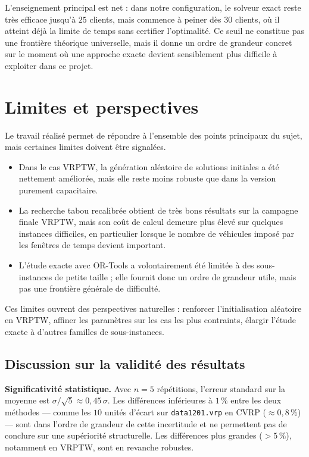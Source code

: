 \documentclass[11pt,a4paper]{article}
\begin{document}
L'enseignement principal est net : dans notre configuration, le solveur exact reste très efficace jusqu'à \(25\) clients, mais commence à peiner dès \(30\) clients, où il atteint déjà la limite de temps sans certifier l'optimalité. Ce seuil ne constitue pas une frontière théorique universelle, mais il donne un ordre de grandeur concret sur le moment où une approche exacte devient sensiblement plus difficile à exploiter dans ce projet.

\section{Limites et perspectives}
\label{sec:limites}

Le travail réalisé permet de répondre à l'ensemble des points principaux du sujet, mais certaines limites doivent être signalées.
\begin{itemize}
    \item Dans le cas VRPTW, la génération aléatoire de solutions initiales a été nettement améliorée, mais elle reste moins robuste que dans la version purement capacitaire.
    \item La recherche tabou recalibrée obtient de très bons résultats sur la campagne finale VRPTW, mais son coût de calcul demeure plus élevé sur quelques instances difficiles, en particulier lorsque le nombre de véhicules imposé par les fenêtres de temps devient important.
    \item L'étude exacte avec OR-Tools a volontairement été limitée à des sous-instances de petite taille ; elle fournit donc un ordre de grandeur utile, mais pas une frontière générale de difficulté.
\end{itemize}

Ces limites ouvrent des perspectives naturelles : renforcer l'initialisation aléatoire en VRPTW, affiner les paramètres sur les cas les plus contraints, élargir l'étude exacte à d'autres familles de sous-instances.

\subsection{Discussion sur la validité des résultats}

\textbf{Significativité statistique.} Avec $n=5$ répétitions, l'erreur standard sur la moyenne est $\sigma/\sqrt{5} \approx 0{,}45\,\sigma$. Les différences inférieures à $1\,\%$ entre les deux méthodes — comme les $10$ unités d'écart sur \texttt{data1201.vrp} en CVRP ($\approx 0{,}8\,\%$) — sont dans l'ordre de grandeur de cette incertitude et ne permettent pas de conclure sur une supériorité structurelle. Les différences plus grandes ($>5\,\%$), notamment en VRPTW, sont en revanche robustes.
\end{document}
